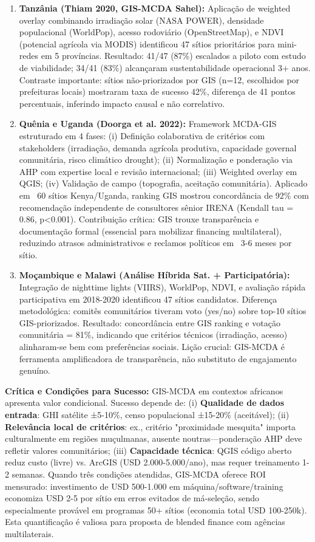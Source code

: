 \documentclass[12pt, a4paper]{article}
\begin{document}
\begin{enumerate}
  \item \textbf{Tanzânia (Thiam 2020, GIS-MCDA Sahel):} Aplicação de weighted overlay combinando irradiação solar (NASA POWER), densidade populacional (WorldPop), acesso rodoviário (OpenStreetMap), e NDVI (potencial agrícola via MODIS) identificou 47 sítios prioritários para mini-redes em 5 províncias. Resultado: 41/47 (87\%) escalados a piloto com estudo de viabilidade; 34/41 (83\%) alcançaram sustentabilidade operacional 3+ anos. Contraste importante: sítios não-priorizados por GIS (n=12, escolhidos por prefeituras locais) mostraram taxa de sucesso 42\%, diferença de 41 pontos percentuais, inferindo impacto causal e não correlativo.

  \item \textbf{Quênia e Uganda (Doorga et al. 2022):} Framework MCDA-GIS estruturado em 4 fases: (i) Definição colaborativa de critérios com stakeholders (irradiação, demanda agrícola produtiva, capacidade governal comunitária, risco climático drought); (ii) Normalização e ponderação via AHP com expertise local e revisão internacional; (iii) Weighted overlay em QGIS; (iv) Validação de campo (topografia, aceitação comunitária). Aplicado em ~60 sítios Kenya/Uganda, ranking GIS mostrou concordância de 92\% com recomendação independente de consultores sênior IRENA (Kendall tau = 0.86, p<0.001). Contribuição crítica: GIS trouxe transparência e documentação formal (essencial para mobilizar financing multilateral), reduzindo atrasos administrativos e reclamos políticos em ~3-6 meses por sítio.

  \item \textbf{Moçambique e Malawi (Análise Híbrida Sat. + Participatória):} Integração de nighttime lights (VIIRS), WorldPop, NDVI, e avaliação rápida participativa em 2018-2020 identificou 47 sítios candidatos. Diferença metodológica: comitês comunitários tiveram voto (yes/no) sobre top-10 sítios GIS-priorizados. Resultado: concordância entre GIS ranking e votação comunitária = 81\%, indicando que critérios técnicos (irradiação, acesso) alinharam-se bem com preferências sociais. Lição crucial: GIS-MCDA é ferramenta amplificadora de transparência, não substituto de engajamento genuíno.
\end{enumerate}

\noindent \textbf{Crítica e Condições para Sucesso:} GIS-MCDA em contextos africanos apresenta valor condicional. Sucesso depende de: (i) \textbf{Qualidade de dados entrada}: GHI satélite ±5-10\%, censo populacional ±15-20\% (aceitável); (ii) \textbf{Relevância local de critérios}: ex., critério "proximidade mesquita" importa culturalmente em regiões muçulmanas,  ausente noutras—ponderação AHP deve refletir valores comunitários; (iii) \textbf{Capacidade técnica}: QGIS código aberto reduz custo (livre) vs. ArcGIS (USD 2.000-5.000/ano), mas requer treinamento 1-2 semanas. Quando três condições atendidas, GIS-MCDA oferece ROI mensurado: investimento de USD 500-1.000 em máquina/software/training economiza USD 2-5 por sítio em erros evitados de má-seleção, sendo especialmente provável em programas 50+ sítios (economia total USD 100-250k). Esta quantificação é valiosa para proposta de blended finance com agências multilaterais.
\end{document}
